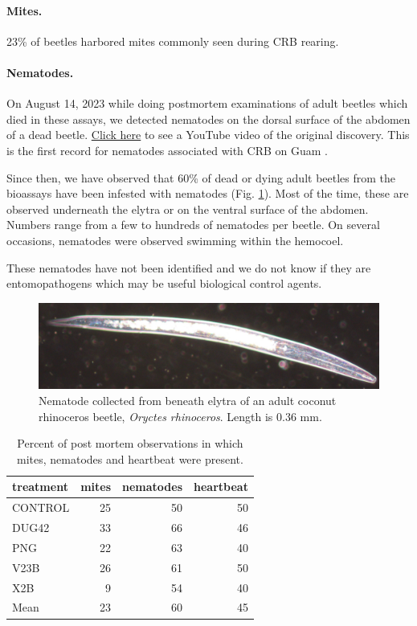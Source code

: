 \documentclass[12pt,letterpaper,english,bibliography=totocnumbered, abstract=on]{scrartcl}
\begin{document}
\paragraph{Mites.} 23\% of beetles harbored mites commonly seen during CRB rearing.

\paragraph{Nematodes.} On August 14, 2023 while doing postmortem examinations of adult beetles which died in these assays, we detected nematodes on the dorsal surface of the abdomen of a dead beetle. \href{https://www.youtube.com/shorts/dKVup7q7FF0}{Click here} to see a YouTube video of the original discovery. This is the first record for nematodes associated with CRB on Guam \cite{Moore2023nematodes}.

Since then, we have observed that 60\%  of dead or dying adult beetles from the bioassays have been infested with nematodes (Fig. \ref{fig:nematode2}). Most of the time, these are observed underneath the elytra or on the ventral surface of the abdomen. Numbers range from a few to hundreds of nematodes per beetle. On several occasions, nematodes were observed swimming within the hemocoel.

These nematodes have not been identified and we do not know if they are entomopathogens which may be useful biological control agents.

\begin{figure}[H]
	\centering
	\includegraphics[width=0.7\linewidth]{images/nematode2}
	\caption{Nematode collected from beneath elytra of an adult coconut rhinoceros beetle, \textit{Oryctes rhinoceros}. Length is 0.36 mm.}
	\label{fig:nematode2}
\end{figure}

\begin{table}[H]
	\centering
	\caption{Percent of post mortem observations in which mites, nematodes and heartbeat were present.}
	\label{ornv detection}

	\begin{tabular}{lrrr}
		\hline
		treatment &  mites &  nematodes &  heartbeat \\
		\hline
		CONTROL &         25 &        50 &             50 \\
		DUG42 &         33 &        66 &             46 \\
		PNG &         22 &        63 &             40 \\
		V23B &         26 &        61 &             50 \\
		X2B &          9 &        54 &             40 \\
		\hline
		Mean & 23 & 60 & 45 \\
		\hline
	\end{tabular}
\end{table}
\end{document}
